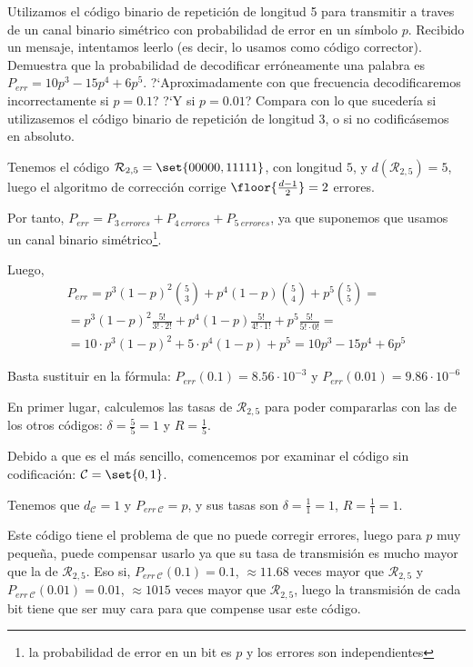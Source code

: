 \begin{problem}[10]  Utilizamos el código binario de repetición de longitud 5
para transmitir a traves de un canal binario simétrico con
probabilidad de error en un símbolo $p$. Recibido un mensaje,
 intentamos leerlo (es decir, lo usamos como
código corrector). Demuestra que la probabilidad de decodificar
erróneamente una palabra es $P_{err}=10p^3-15p^4+6p^5$.
?`Aproximadamente con que frecuencia decodificaremos
incorrectamente si $p=0.1$? ?`Y si  $p=0.01$? Compara con lo que
sucedería si utilizasemos el código binario de repetición de
longitud 3, o si no codificásemos en absoluto.
\solution


\spart
Tenemos el código $\mathcal{R}_{2,5}=\set{00000,11111}$, con longitud $5$, y $d(\mathcal{R}_{2,5}) = 5$, luego el algoritmo de corrección corrige $\floor{\frac{d-1}{2}} = 2$ errores.

Por tanto, $P_{err} = P_{3\ errores} + P_{4\ errores} + P_{5\ errores}$, ya que suponemos que usamos un canal binario simétrico\footnote{la probabilidad de error en un bit es $p$ y los errores son independientes}.

Luego,
\begin{align*}
P_{err} = p^3 (1-p)^2 {{5}\choose{3}} + p^4 (1-p) {{5}\choose{4}} + p^5 {{5}\choose{5}} =\\
= p^3 (1-p)^2 {\frac{5!}{3! \cdot 2!}} + p^4 (1-p) {\frac{5!}{4! \cdot 1!}} + p^5 {\frac{5!}{5! \cdot 0!}} =\\
= 10 \cdot p^3 (1-p)^2 + 5 \cdot p^4 (1-p) + p^5 = 10p^3-15p^4+6p^5
\end{align*}

\spart
Basta sustituir en la fórmula:
$P_{err}(0.1) = 8.56 \cdot {10}^{-3}$ y $P_{err}(0.01) = 9.86 \cdot {10}^{-6}$

\spart
En primer lugar, calculemos las tasas de $\mathcal{R}_{2,5}$ para poder compararlas con las de los otros códigos: $\delta = \frac{5}{5} = 1$ y $R = \frac{1}{5}$.

Debido a que es el más sencillo, comencemos por examinar el código sin codificación: $\mathcal{C} = \set{0,1}$.

Tenemos que $d_\mathcal{C} = 1$ y $P_{err \ \mathcal{C}} = p$, y sus tasas son $\delta = \frac{1}{1} = 1$, $R = \frac{1}{1} = 1$.

Este código tiene el problema de que no puede corregir errores, luego para $p$ muy pequeña, puede compensar usarlo ya que su tasa de transmisión es mucho mayor que la de $\mathcal{R}_{2,5}$. Eso si, $P_{err \ \mathcal{C}}(0.1) = 0.1$, $\approx 11.68$ veces mayor que $\mathcal{R}_{2,5}$ y $P_{err \ \mathcal{C}}(0.01) = 0.01$, $\approx 1015$ veces mayor que $\mathcal{R}_{2,5}$, luego la transmisión de cada bit tiene que ser muy cara para que compense usar este código.\\


\end{problem}
